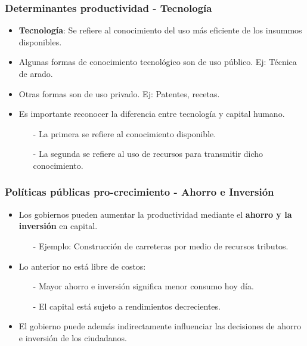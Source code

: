 \documentclass{beamer}
\begin{document}
\begin{frame}
\frametitle{Determinantes productividad - Tecnolog\'ia}
\begin{itemize}
\setlength\itemsep{1.4em}
\item \textbf{Tecnolog\'ia}: Se refiere al conocimiento del uso m\'as eficiente de los insummos disponibles.
\item Algunas formas de conocimiento tecnol\'ogico son de uso p\'ublico. Ej: T\'ecnica de arado.
\item Otras formas son de uso privado. Ej: Patentes, recetas.
\item Es importante reconocer la diferencia entre tecnolog\'ia y capital humano.\\
\begin{itemize}
\setlength\itemsep{0.7em}
\item[-] La primera se refiere al conocimiento disponible.
\item[-] La segunda se refiere al uso de recursos para transmitir dicho conocimiento.
\end{itemize}
\end{itemize}
\end{frame}

\begin{frame}
\frametitle{Pol\'iticas p\'ublicas pro-crecimiento - Ahorro e Inversi\'on}
\begin{itemize}
\setlength\itemsep{1.5em}
\item Los gobiernos pueden aumentar la productividad mediante el \textbf{ahorro y la inversi\'on} en capital.\\
\begin{itemize}
\item[-] Ejemplo: Construcci\'on de carreteras por medio de recursos tributos.
\end{itemize}
\item Lo anterior no est\'a libre de costos: \\
\begin{itemize}
\setlength\itemsep{0.7em}
\item[-] Mayor ahorro e inversi\'on significa menor consumo hoy d\'ia.
\item[-] El capital est\'a sujeto a rendimientos decrecientes.
\end{itemize}
\item El gobierno puede adem\'as indirectamente influenciar las decisiones de ahorro e inversi\'on de los ciudadanos.
\end{itemize}
\end{frame}
\end{document}
